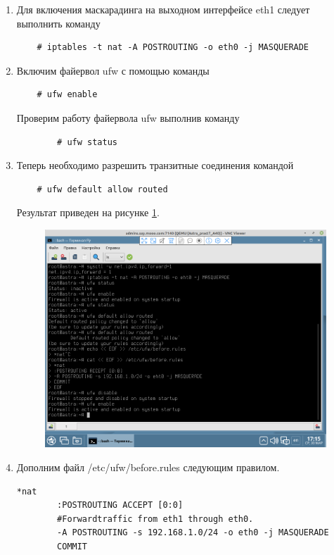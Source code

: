 \documentclass[a4paper,14pt]{extarticle}
\begin{document}
\begin{enumerate}
	\item Для включения маскарадинга на выходном интерфейсе eth1 следует выполнить команду 
	
	\begin{lstlisting}
	# iptables -t nat -A POSTROUTING -o eth0 -j MASQUERADE\end{lstlisting}
	
	\item Включим файервол ufw с помощью команды 
	
	\begin{lstlisting}
	# ufw enable\end{lstlisting}
	
	Проверим работу файервола ufw выполнив команду
		\begin{lstlisting}
		# ufw status\end{lstlisting}

	\item Теперь необходимо разрешить транзитные соединения командой 
	
	\begin{lstlisting}
	# ufw default allow routed\end{lstlisting}
	
	Результат приведен на рисунке \ref{fig:---2022-03-30-17-15-09}.
	
	\begin{figure}[h!]
		\centering
		\includegraphics[width=0.5\linewidth]{"images/Снимок экрана от 2022-03-30 17-15-09"}
		\caption{}
		\label{fig:---2022-03-30-17-15-09}
	\end{figure}
	\newpage
	\item Дополним файл /etc/ufw/before.rules следующим правилом.
	
	
	
	\begin{lstlisting}[caption=/etc/ufw/before.rules, label=sdfsdf]
		*nat
		:POSTROUTING ACCEPT [0:0]
		#Forwardtraffic from eth1 through eth0.
		-A POSTROUTING -s 192.168.1.0/24 -o eth0 -j MASQUERADE
		COMMIT	\end{lstlisting}
	

\end{enumerate}
\end{document}

